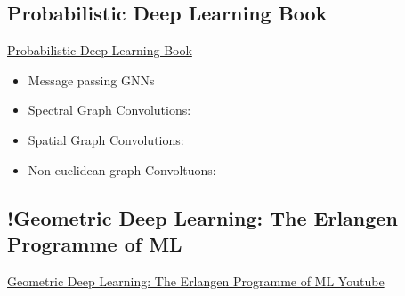 \subsection{Probabilistic Deep Learning Book}
\href{https://probml.github.io/pml-book/book1.html}{Probabilistic Deep Learning Book}
\begin{itemize}[noitemsep,nolistsep]
	\item Message passing GNNs
	\item Spectral Graph Convolutions:
	\item Spatial Graph Convolutions:
	\item Non-euclidean graph Convoltuons:
\end{itemize}

\subsection{!Geometric Deep Learning: The Erlangen Programme of ML}
\href{https://www.youtube.com/watch?v=w6Pw4MOzMuo}{Geometric Deep Learning: The Erlangen Programme of ML Youtube}
